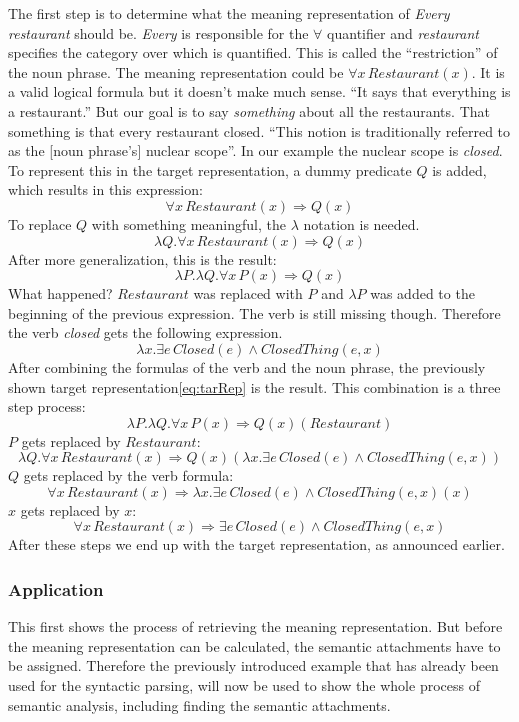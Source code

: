 \documentclass[12pt,twoside]{scrartcl}
\theoremstyle{plain}
\theoremstyle{definition}
\theoremstyle{remark}
\begin{document}
		The first step is to determine what the meaning representation of \textit{Every restaurant} should be. \textit{Every} is responsible for the $\forall$ quantifier and \textit{restaurant} specifies the category over which is quantified. This is called the ``restriction''\cite[p.~622]{Jurafsky2009} of the noun phrase. The meaning representation could be $\forall x\,Restaurant(x)$. It is a valid logical formula but it doesn't make much sense. ``It says that everything is a restaurant.''\cite[p.~622]{Jurafsky2009} But our goal is to say \textit{something} about all the restaurants. That something is that every restaurant closed. ``This notion is traditionally referred to as the [noun phrase's] nuclear scope''\cite[p.~622]{Jurafsky2009}. In our example the nuclear scope is \textit{closed}. To represent this in the target representation, a dummy predicate $Q$ is added, which results in this expression:
		\[
			\forall x\,Restaurant(x) \Rightarrow Q(x)
		\]
		To replace $Q$ with something meaningful, the $\lambda$ notation is needed.
		\[
			\lambda Q.\forall x\,Restaurant(x) \Rightarrow Q(x)
		\] 
		After more generalization, this is the result:
		\[
			\lambda P.\lambda Q.\forall x\,P(x) \Rightarrow Q(x)
		\]
		What happened? $Restaurant$ was replaced with $P$ and $\lambda P$ was added to the beginning of the previous expression. The verb is still missing though. Therefore the verb \textit{closed} gets the following expression.
		\[
			\lambda x.\exists e\,Closed(e) \wedge ClosedThing(e,x)
		\]
		After combining the formulas of the verb and the noun phrase, the previously shown target representation\eqref{eq:tarRep} is the result. This combination is a three step process:
		\[
			\lambda P.\lambda Q.\forall x\,P(x) \Rightarrow Q(x)(Restaurant)
		\]
		$P$ gets replaced by $Restaurant$:
		\[
			\lambda Q.\forall x\,Restaurant(x) \Rightarrow Q(x)(\lambda x.\exists e\,Closed(e) \wedge ClosedThing(e,x))
		\]
		$Q$ gets replaced by the verb formula:
		\[
			\forall x\,Restaurant(x) \Rightarrow \lambda x.\exists e\,Closed(e) \wedge ClosedThing(e,x)(x)
		\]
		$x$ gets replaced by $x$:
		\[
			\forall x\,Restaurant(x) \Rightarrow \exists e\,Closed(e) \wedge ClosedThing(e,x)
		\]
		After these steps we end up with the target representation, as announced earlier.
		
		\subsubsection*{Application}
		\label{subSub:applicationSem}
		
		This first shows the process of retrieving the meaning representation. But before the meaning representation can be calculated, the semantic attachments have to be assigned. Therefore the previously introduced example that has already been used for the syntactic parsing, will now be used to show the whole process of semantic analysis, including finding the semantic attachments. 
		
\end{document}
